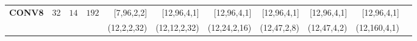 \begin{table}[]
\begin{threeparttable}
\begin{tabular}{lrrrrrrrrrr }
\multirow{-2}{*}{\textbf{CONV8}} &\multirow{-2}{*}{32}&\multirow{-2}{*}{$14$} & \multirow{-2}{*}{$192$}&[\hspace{0.5em}7,\hspace{1em}96,\hspace{0.5em}2,\hspace{0.5em}\hspace{0.5em}2] &[12,\hspace{1em}96,\hspace{0.5em}4,\hspace{0.5em}\hspace{0.5em}1] &[12,\hspace{1em}96,\hspace{0.5em}4,\hspace{0.5em}\hspace{0.5em}1] &[12,\hspace{1em}96,\hspace{0.5em}4,\hspace{0.5em}\hspace{0.5em}1] &[12,\hspace{1em}96,\hspace{0.5em}4,\hspace{0.5em}\hspace{0.5em}1] &[12,\hspace{1em}96,\hspace{0.5em}4,\hspace{0.5em}\hspace{0.5em}1] \\
\rowcolor{Gray}& & & &(12,\hspace{1.5em}2,\hspace{0.5em}2,\hspace{0.5em}32) &(12,\hspace{1em}12,\hspace{0.5em}2,\hspace{0.5em}32) &(12,\hspace{1em}24,\hspace{0.5em}2,\hspace{0.5em}16) &(12,\hspace{1em}47,\hspace{0.5em}2,\hspace{0.5em}\hspace{0.5em}8) &(12,\hspace{1em}47,\hspace{0.5em}4,\hspace{0.5em}\hspace{0.5em}2) &(12,\hspace{0.5em}160,\hspace{0.5em}4,\hspace{0.5em}\hspace{0.5em}1) \\

\end{tabular}
\end{threeparttable}
\end{table}
